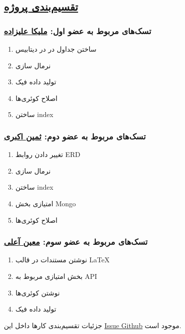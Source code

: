 \subsection*{\underline{تقسیم‌بندی پروژه}}
\subsubsection*{تسک‌های مربوط به عضو اول: \href{https://github.com/MelikaAlizadeh}{ملیکا علیزاده}}
\begin{enumerate}
	
	
	\item ساختن جداول در در دیتابیس
	\item نرمال سازی 
	\item تولید داده فیک
	\item  اصلاح کوئری‌ها
	\item ساختن index
	
\end{enumerate}
\subsubsection*{تسک‌های مربوط به عضو دوم: \href{https://github.com/saminakbari}{ثمین اکبری} }
\begin{enumerate}
	
	\item تغییر دادن روابط ERD
	\item نرمال سازی 
	\item ساختن index
	\item امتیازی بخش Mongo
	\item اصلاح کوئری‌ها
	
	
\end{enumerate}
\subsubsection*{تسک‌های مربوط به عضو سوم: \href{https://github.com/MoeeinAali}{معین آعلی}}
\begin{enumerate}
	
	\item نوشتن مستندات در قالب LaTeX
	\item بخش امتیازی مربوط به API 
	\item نوشتن کوئری‌ها
	\item تولید داده فیک
	
\end{enumerate}

جزئیات تقسیم‌بندی کارها داخل این 
\href{https://github.com/MoeeinAali/DB-Project/issues/3}{Issue Github}
موجود است.